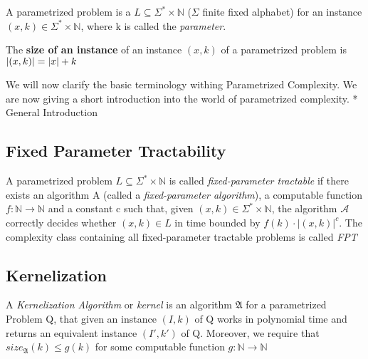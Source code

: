 \begin{definition}
    A parametrized problem is a $L\subseteq\Sigma^*\times \mathbb{N}$ ($\Sigma$ finite fixed alphabet) for an instance $(x,k)\in \Sigma^*\times \mathbb{N}$, where k is called the \textit{parameter}.
\end{definition}

\begin{definition}
    The \textbf{size of an instance} of an instance $(x,k)$ of a parametrized problem is $\abs{(x,k)} = \abs{x} + k$
\end{definition}
We will now clarify the basic terminology withing Parametrized Complexity. 
We are now giving a short introduction into the world of parametrized complexity. 
* General Introduction


\subsection{Fixed Parameter Tractability}

\begin{definition} 
    A parametrized problem $L\subseteq\Sigma^*\times\mathbb{N}$ is called \textit{fixed-parameter tractable} if there exists an algorithm A (called a \textit{fixed-parameter algorithm}), a computable function $f:\mathbb{N} \rightarrow \mathbb{N}$ and a constant c such that, given $(x,k) \in \Sigma^* \times \mathbb{N}$, the algorithm $\mathcal{A}$ correctly decides whether $(x,k) \in L$ in time bounded by $f(k) \cdot |(x,k)|^c$. The complexity class containing all fixed-parameter tractable problems is called \textit{FPT}
\end{definition}


\subsection{Kernelization}

\begin{definition}
A \textit{Kernelization Algorithm} or \textit{kernel} is an algorithm $\mathfrak{A}$ for a parametrized Problem Q, that given an instance $(I,k)$ of Q works in polynomial time and returns an equivalent instance $(I', k')$ of Q. Moreover, we require that $size_{\mathfrak{A}}(k) \leq g(k)$ for some computable function $g:\mathbb{N} \rightarrow \mathbb{N}$
\end{definition}

